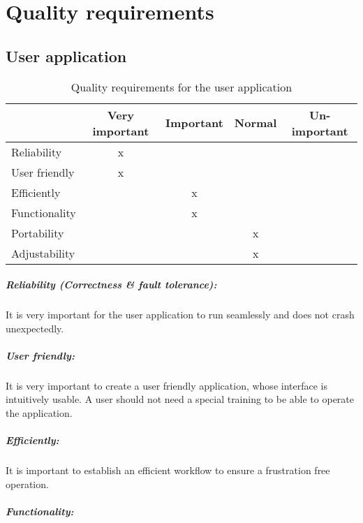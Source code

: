 \chapter{Quality requirements}
\section{User application}

\begin{table}[h]
  \begin{tabular}{| l || c | c | c | c |}
      \hline
      & Very important & Important & Normal & Un-important \\ \hline \hline
      Reliability & x & & & \\ \hline
      User friendly & x & & & \\ \hline
      Efficiently & & x & & \\ \hline
      Functionality & & x & & \\ \hline
      Portability & & & x &  \\ \hline
      Adjustability & & & x &  \\ \hline
  \end{tabular}
  \caption{Quality requirements for the user application}
\end{table}

\paragraph{Reliability (Correctness \& fault tolerance):}

It is very important for the user application to run seamlessly and does not crash unexpectedly.

\paragraph{User friendly:}

It is very important to create a user friendly application, whose interface is intuitively usable. A user should not need a special training to be able to operate the application.

\paragraph{Efficiently:}

It is important to establish an efficient workflow to ensure a frustration free operation. 

\paragraph{Functionality:}

